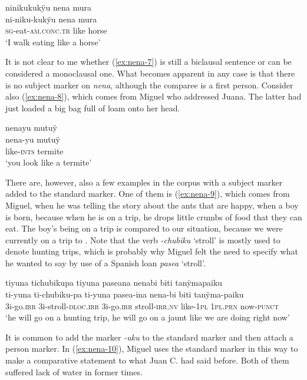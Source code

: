 \ea\label{ex:nena-7}
\begingl
\glpreamble ninikukukÿu nena mura\\
\gla ni-niku-kukÿu nena mura\\
\textsc{sg}-eat-\textsc{am.conc.tr} like horse\\
\glft ‘I walk eating like a horse’
\endgl
\trailingcitation{[rmx-e150922l.066]}
\xe

It is not clear to me whether (\ref{ex:nena-7}) is still a biclausal sentence or can be considered a monoclausal one. What becomes apparent in any case is that there is no subject marker on \textit{nena}, although the comparee is a first person. Consider also (\ref{ex:nena-8}), which comes from Miguel who addressed Juana. The latter had just loaded a big bag full of loam onto her head.

\ea\label{ex:nena-8}
\begingl
\glpreamble nenayu mutuÿ\\
\gla nena-yu mutuÿ\\
\glb like-\textsc{ints} termite\\
\glft ‘you look like a termite’
\endgl
\trailingcitation{[jmx-d110918ls-1.112]}
\xe

There are, however, also a few examples in the corpus with a subject marker added to the standard marker. One of them is (\ref{ex:nena-9}), which comes from Miguel, when he was telling the story about the ants that are happy, when a boy is born, because when he is on a trip, he drops little crumbs of food that they can eat. The boy’s being on a trip is compared to our situation, because we were currently on a trip to . Note that the verb \textit{-chubiku} ‘stroll’ is mostly used to denote hunting trips, which is probably why Miguel felt the need to specify what he wanted to say by use of a Spanish loan \textit{pasea} ‘stroll’.

\ea\label{ex:nena-9}
\begingl
\glpreamble tiyuna tichubikupa tiyuna paseana nenabi biti tanÿmapaiku\\
\gla ti-yuna ti-chubiku-pa ti-yuna pasea-ina nena-bi biti tanÿma-paiku\\
\glb 3i-go.\textsc{irr} 3i-stroll-\textsc{dloc.irr} 3i-go.\textsc{irr} stroll-\textsc{irr.nv} like-1\textsc{pl} 1\textsc{pl.prn} now-\textsc{punct}\\
\glft ‘he will go on a hunting trip, he will go on a jaunt like we are doing right now’
\endgl
{}
\xe

It is common to add the  marker \textit{-uku} to the standard marker and then attach a person marker. In (\ref{ex:nena-10}), Miguel uses the standard marker in this way to make a comparative statement to what Juan C. had said before. Both of them suffered lack of water in former times.

